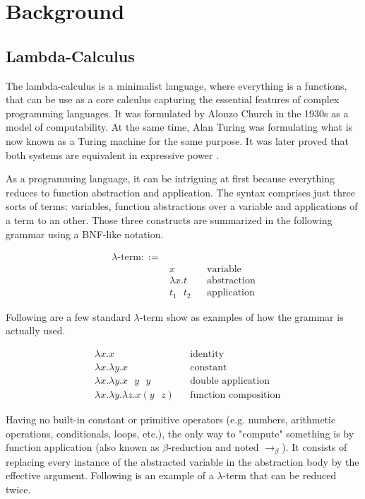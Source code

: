 \section{Background}
\label{sec:background}

\subsection{Lambda-Calculus}
\label{sec:background-lambda-calculus}

The lambda-calculus is a minimalist language, where everything is a functions, that can be use as a
core calculus capturing the essential features of complex programming languages. It was formulated
by Alonzo Church \cite{???} in the 1930s as a model of computability. At the same time, Alan Turing
was formulating what is now known as a Turing machine \cite{???} for the same purpose. It was later
proved that both systems are equivalent in expressive power \cite{???}.

As a programming language, it can be intriguing at first because everything reduces to function
abstraction and application. The syntax comprises just three sorts of terms: variables, function
abstractions over a variable and applications of a term to an other. Those three constructs are
summarized in the following grammar using a BNF-like notation.

\begin{align*}
  \lambda\text{-term} ::= & \\
    & x && \text{variable} \\
    & \lambda x. t && \text{abstraction} \\
    & t_1 \text{ } t_2 && \text{application}
\end{align*}

Following are a few standard $\lambda$-term show as examples of how the grammar is actually used.

\begin{align*}
  & \lambda x. x && \text{identity} \\
  & \lambda x. \lambda y. x && \text{constant} \\
  & \lambda x. \lambda y. x \text{ } y \text{ } y && \text{double application} \\
  & \lambda x. \lambda y. \lambda z. x (y \text{ } z) && \text{function composition}
\end{align*}

Having no built-in constant or primitive operators (e.g. numbers, arithmetic operations,
conditionals, loops, etc.), the only way to "compute" something is by function application (also
known as $\beta$-reduction and noted $\to_\beta$). It consists of replacing every instance of the
abstracted variable in the abstraction body by the effective argument. Following is an example of a
$\lambda$-term that can be reduced twice.

